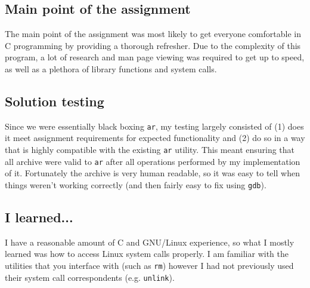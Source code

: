 \documentclass[letterpaper,10pt,titlepage]{article}
\begin{document}
\subsection{Main point of the assignment} 
The main point of the assignment was most likely to get everyone comfortable in C
programming by providing a thorough refresher. Due to the complexity of this program,
a lot of research and man page viewing was required to get up to speed, as well as
a plethora of library functions and system calls.

\subsection{Solution testing}
Since we were essentially black boxing \verb~ar~, my testing largely consisted of
(1) does it meet assignment requirements for expected functionality and (2) do
so in a way that is highly compatible with the existing \verb~ar~ utility. This meant
ensuring that all archive were valid to \verb~ar~ after all operations performed by
my implementation of it. Fortunately the archive is very human readable, so it
was easy to tell when things weren't working correctly (and then fairly easy to fix
using \verb~gdb~).

\subsection{I learned...}
I have a reasonable amount of C and GNU/Linux experience, so what I mostly learned
was how to access Linux system calls properly. I am familiar with the utilities
that you interface with (such as \verb~rm~) however I had not previously used
their system call correspondents (e.g. \verb~unlink~).
\end{document}
